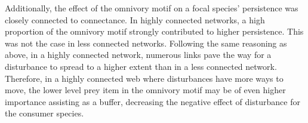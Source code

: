 \documentclass[12pt]{article}
\begin{document}
\begin{spacing}{2.0}
Additionally, the effect of the omnivory motif on a focal species' persistence was closely connected to connectance. In highly connected networks, a high proportion of the omnivory motif strongly contributed to higher persistence. This was not the case in less connected networks. 
Following the same reasoning as above, in a highly connected network, numerous links pave the way for a disturbance to spread to a higher extent than in a less connected network. 
Therefore, in a highly connected web where disturbances have more ways to move, the lower level prey item in the omnivory motif may be of even higher importance assisting as a buffer, decreasing the negative effect of disturbance for the consumer species.






\end{spacing}
\end{document}
